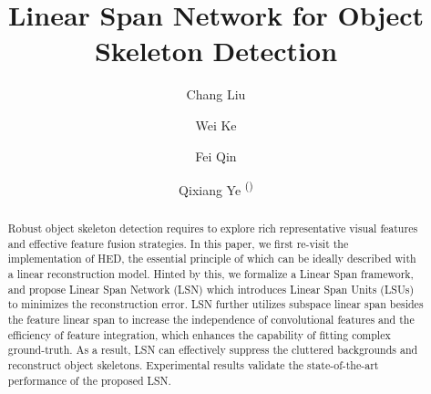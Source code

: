 \documentclass[runningheads]{llncs}
\begin{document}
%
\title{Linear Span Network for Object Skeleton Detection} 


\author{Chang Liu\inst{*}  \and
Wei Ke\inst{*} \and
Fei Qin \and
Qixiang Ye \textsuperscript{(\Letter)}}
%
%
%
 \maketitle   %
%
\begin{abstract}
Robust object skeleton detection requires to explore rich representative visual features and effective feature fusion strategies. In this paper, we first re-visit the implementation of HED, the essential principle of which can be ideally described with a linear reconstruction model. Hinted by this, we formalize a Linear Span framework, and propose Linear Span Network (LSN) which introduces Linear Span Units (LSUs) to minimizes the reconstruction error. LSN further utilizes subspace linear span besides the feature linear span to increase the independence of convolutional features and the efficiency of feature integration, which enhances the capability of fitting complex ground-truth. As a result, LSN can effectively suppress the cluttered backgrounds and reconstruct object skeletons. Experimental results validate the state-of-the-art performance of the proposed LSN.{\let\thefootnote\relax{}}
{\let\thefootnote\relax{}}


\end{abstract}
%
%
%
\end{document}
